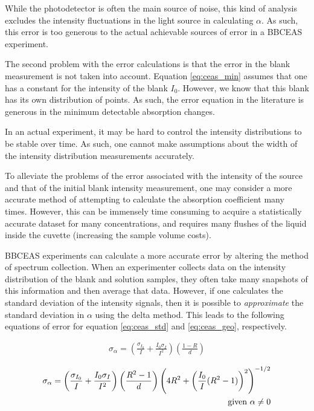 While the photodetector is often the main source of noise, this kind of
analysis excludes the intensity fluctuations in the light source in
calculating $\alpha$. As such, this error is too generous to the actual
achievable sources of error in a \ac{BBCEAS} experiment.

The second problem with the error calculations is that the error in the blank
measurement is not taken into account. Equation \eqref{eq:ceas_min} assumes
that one has a constant for the intensity of the blank $I_0$. However, we know
that this blank has its own distribution of points. As such, the error
equation in the literature is generous in the minimum detectable absorption
changes.

In an actual experiment, it may be hard to control the intensity distributions
to be stable over time. As such, one cannot make assumptions about the width
of the intensity distribution measurements accurately.

To alleviate the problems of the error associated with the intensity of the
source and that of the initial blank intensity measurement, one may consider a
more accurate method of attempting to calculate the absorption coefficient
many times. However, this can be immensely time consuming to acquire a
statistically accurate dataset for many concentrations, and requires many
flushes of the liquid inside the cuvette (increasing the sample volume
costs).

\ac{BBCEAS} experiments can calculate a more accurate error by altering the
method of spectrum collection. When an experimenter collects data on the
intensity distribution of the blank and solution samples, they often take many
snapshots of this information and then average that data. However, if one
calculates the standard deviation of the intensity signals, then it is
possible to \emph{approximate} the standard deviation in $\alpha$ using the
delta method. This leads to the following equations of error for equation
\eqref{eq:ceas_std} and \eqref{eq:ceas_geo}, respectively.

    \begin{align}
      \sigma_\alpha = \left(\frac{\sigma_{I_0}}{I} +
      \frac{I_0\sigma_I}{I^2}\right)
      \left(\frac{1-R}{d}\right)\label{eq:ceas_err_std}
    \end{align}


    \begin{align}
      \sigma_\alpha = \left(\frac{\sigma_{I_0}}{I} +
      \frac{I_0\sigma_I}{I^2}\right)
      \left(\dfrac{R^2-1}{d}\right)\left(4R^2+\left(\frac{I_0}{I}(R^2-1)\right)^2\right)^{-1/2}\label{eq:ceas_err_geo}\\\text{
      given $\alpha \neq 0$}\notag
    \end{align}

